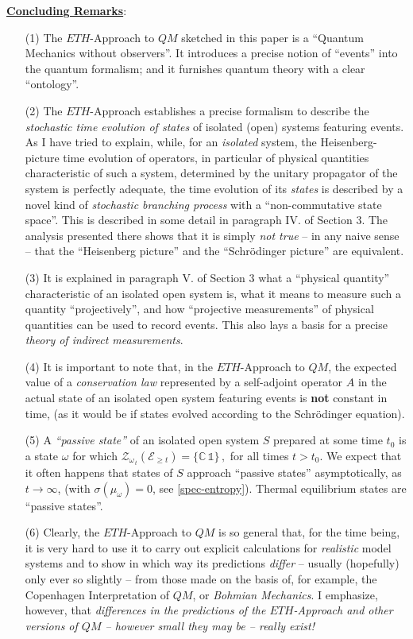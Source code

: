 \documentclass[a4paper,11pt]{article}
\begin{document}
\underline{\bf{Concluding Remarks}}:
\begin{enumerate}
\item[(1)]{The $ETH$-Approach to $QM$ sketched in this paper is a ``Quantum Mechanics without observers''. It introduces a precise notion of ``events'' into the quantum formalism; and it furnishes quantum theory with a clear ``ontology''.}
\item[(2)]{The $ETH$-Approach establishes a precise formalism to describe the \textit{stochastic time evolution of states} of isolated (open) systems featuring events. As I have tried to explain, while, for an \textit{isolated} system, the Heisenberg-picture time evolution of operators, in particular of physical quantities characteristic of such a system, determined by the unitary propagator of the system is perfectly adequate, the time evolution of its \textit{states} is described by a novel kind of \textit{stochastic branching process} with a ``non-commutative state space''. This is described in some detail in paragraph IV. of Section 3. The analysis presented there shows that it is simply \textit{not true} -- in any naive sense -- that the ``Heisenberg picture'' and the ``Schr\"{o}dinger picture'' are equivalent.}
\item[(3)]{It is explained in paragraph V. of Section 3 what a ``physical quantity'' characteristic of an isolated open system is, what it means to measure such a quantity ``projectively'', and how ``projective measurements'' of physical quantities can be used to record events. This also lays a basis for a precise \textit{theory of indirect measurements}.}
\item[(4)]{It is important to note that, in the $ETH$-Approach to $QM$, the expected value of a \textit{conservation law} represented by a self-adjoint operator $A$ in the actual state of an isolated open system featuring events is {\bf{not}} constant in time, (as it would be if states evolved according to the Schr\"{o}dinger equation).}
\item[(5)]{A \textit{``passive state''} of an isolated open system $S$ prepared at some time $t_0$ is a state $\omega$ for which 
$\mathcal{Z}_{\omega_{\,t}}(\mathcal{E}_{\geq t}) = \lbrace \mathbb{C}\, \mathds{1} \rbrace\,,$ for all times $t>t_0$. We expect that it often happens that states of $S$ approach ``passive states'' asymptotically, as $t\rightarrow \infty$, (with $\sigma(\mu_{\omega})=0$, see \eqref{spec-entropy}). Thermal equilibrium states are ``passive states''.
}
\item[(6)]{Clearly, the $ETH$-Approach to $QM$ is so general that, for the time being, it is very hard to use it to carry out explicit calculations for \textit{realistic} model systems and to show in which way its predictions \textit{differ} -- usually (hopefully) only ever so slightly -- from those made on the basis of, for example, the Copenhagen Interpretation of $QM$, or \textit{Bohmian Mechanics}. I emphasize, however, that \textit{differences in the predictions of the $ETH$-Approach and other versions of $QM$ -- however small they may be -- really exist!}}

\end{enumerate}
\end{document}
